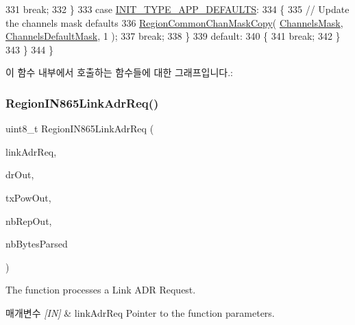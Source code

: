 \begin{DoxyCode}
331             \textcolor{keywordflow}{break};
332         \}
333         \textcolor{keywordflow}{case} \mbox{\hyperlink{group___r_e_g_i_o_n_gga11ecad794560a3d3961bdf1c9a27d3b2a3d260b94611dd833c5243c16ca26c3f0}{INIT\_TYPE\_APP\_DEFAULTS}}:
334         \{
335             \textcolor{comment}{// Update the channels mask defaults}
336             \mbox{\hyperlink{group___r_e_g_i_o_n_c_o_m_m_o_n_ga95f5199d490113269fae7f2e0569e9a0}{RegionCommonChanMaskCopy}}( \mbox{\hyperlink{_region_i_n865_8c_a2188957b5ca6af8092154d7ccbfa5757}{ChannelsMask}}, 
      \mbox{\hyperlink{_region_i_n865_8c_ac127b19779301713d5ed92eb03366a2d}{ChannelsDefaultMask}}, 1 );
337             \textcolor{keywordflow}{break};
338         \}
339         \textcolor{keywordflow}{default}:
340         \{
341             \textcolor{keywordflow}{break};
342         \}
343     \}
344 \}
\end{DoxyCode}
이 함수 내부에서 호출하는 함수들에 대한 그래프입니다.\+:
\mbox{\label{group___r_e_g_i_o_n_i_n865_ga97f6332c9583f63e5bbb00b123d80698}} 
\subsubsection{\texorpdfstring{Region\+I\+N865\+Link\+Adr\+Req()}{RegionIN865LinkAdrReq()}}
{\footnotesize\ttfamily uint8\+\_\+t Region\+I\+N865\+Link\+Adr\+Req (\begin{DoxyParamCaption}\item[{\mbox{\hyperlink{group___r_e_g_i_o_n_gad4af503e8d4de1846129e26a799a1e8e}{Link\+Adr\+Req\+Params\+\_\+t}} $\ast$}]{link\+Adr\+Req,  }\item[{int8\+\_\+t $\ast$}]{dr\+Out,  }\item[{int8\+\_\+t $\ast$}]{tx\+Pow\+Out,  }\item[{uint8\+\_\+t $\ast$}]{nb\+Rep\+Out,  }\item[{uint8\+\_\+t $\ast$}]{nb\+Bytes\+Parsed }\end{DoxyParamCaption})}



The function processes a Link A\+DR Request. 


\begin{DoxyParams}{매개변수}
{\em \mbox{[}\+I\+N\mbox{]}} & link\+Adr\+Req Pointer to the function parameters.\\
\hline
\end{DoxyParams}

